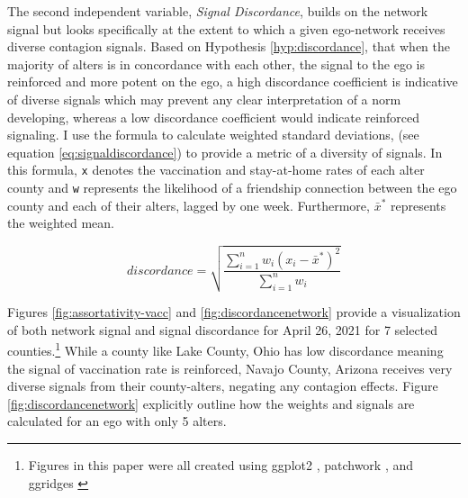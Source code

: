The second independent variable, \emph{Signal Discordance}, builds on the
network signal but looks specifically at the extent to which a given ego-network
receives diverse contagion signals. Based on Hypothesis \ref{hyp:discordance},
that when the majority of alters is in concordance with each other, the signal
to the ego is reinforced and more potent on the ego, a high discordance
coefficient is indicative of diverse signals which may prevent any clear
interpretation of a norm developing, whereas a low discordance coefficient would
indicate reinforced signaling. I use the formula to calculate weighted standard
deviations, (see equation \eqref{eq:signaldiscordance}) to provide a metric of a
diversity of signals. In this formula, \texttt{x} denotes the vaccination and
stay-at-home rates of each alter county and \texttt{w} represents the likelihood
of a friendship connection between the ego county and each of their alters,
lagged by one week. Furthermore, \(\bar{x}^*\) represents the weighted mean.

\begin{equation}
discordance = \sqrt{\frac{\sum_{i=1}^nw_i(x_i-\bar{x}^*)^2}{\sum^n_{i=1}w_i}} \label{eq:signaldiscordance}
\end{equation}

Figures \ref{fig:assortativity-vacc} and \ref{fig:discordancenetwork} provide a
visualization of both network signal and signal discordance for April 26, 2021
for 7 selected counties.\footnote{Figures in this paper were all created using
ggplot2 \citep{wickham_etal, wickham11}, patchwork \citep{pedersen20}, and
ggridges \citep{ggridges}} While a county like Lake County, Ohio has low
discordance meaning the signal of vaccination rate is reinforced, Navajo County,
Arizona receives very diverse signals from their county-alters, negating any
contagion effects. Figure \ref{fig:discordancenetwork} explicitly outline how
the weights and signals are calculated for an ego with only 5 alters.

